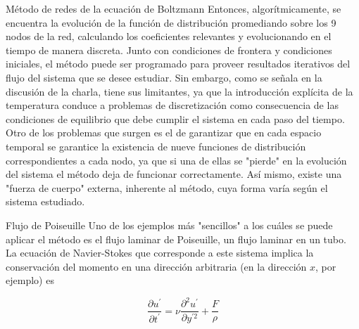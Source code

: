 \documentclass[12pt]{article}
\begin{document}
\begin {section} {Método de redes de la ecuación de Boltzmann}
Entonces, algorítmicamente, se encuentra la evolución de la función de distribución promediando sobre los 9 nodos de la red, calculando los coeficientes relevantes y evolucionando en el tiempo de manera discreta. Junto con condiciones de frontera y condiciones iniciales, el método puede ser programado para proveer resultados iterativos del flujo del sistema que se desee estudiar. 
Sin embargo, como se señala en la discusión de la charla, tiene sus limitantes, ya que la introducción explícita de la temperatura conduce a problemas de discretización como consecuencia de las condiciones de equilibrio que debe cumplir el sistema en cada paso del tiempo. Otro de los problemas que surgen es el de garantizar que en cada espacio temporal se garantice la existencia de nueve funciones de distribución correspondientes a cada nodo, ya que si una de ellas se "pierde" en la evolución del sistema el método deja de funcionar correctamente. Así mismo, existe una "fuerza de cuerpo" externa, inherente al método, cuya forma varía según el sistema estudiado.

\begin {subsection} {Flujo de Poiseuille}
Uno de los ejemplos más "sencillos" a los cuáles se puede aplicar el método es el flujo laminar de Poiseuille, un flujo laminar en un tubo. La ecuación de Navier-Stokes que corresponde a este sistema implica la conservación del momento en una dirección arbitraria (en la dirección $x$, por ejemplo) es

\begin {equation*}
\dfrac{\partial u^{\prime}}{\partial t^{\prime}} = \nu \dfrac{\partial^2u^{\prime}}{\partial y^{\prime 2}} + \dfrac{F}{\rho}
\end {equation*}


\end{subsection}
\end{section}
\end{document}
